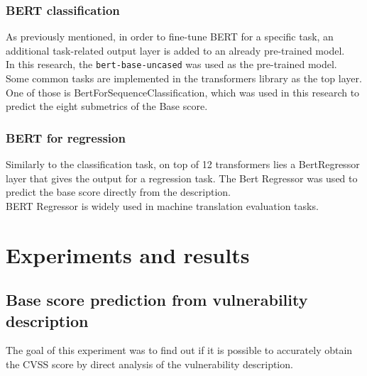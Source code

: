 \documentclass[times, utf8, zavrsni, english]{fer}
\begin{document}
\subsection{BERT classification}
As previously mentioned, in order to fine-tune BERT for a specific task, an additional task-related output layer is added to an already pre-trained model.\\
In this research, the \texttt{bert-base-uncased} was used as the pre-trained model.\\
Some common tasks are implemented in the transformers library as the top layer. One of those is BertForSequenceClassification, which was used in this research to predict the eight submetrics of the Base score. 
\subsection{BERT for regression}
Similarly to the classification task, on top of 12 transformers lies a BertRegressor layer that gives the output for a regression task. The Bert Regressor was used to predict the base score directly from the description.\\
BERT Regressor is widely used in machine translation evaluation tasks. \citep{shimanaka}

\chapter{Experiments and results}
\section{Base score prediction from vulnerability description}
The goal of this experiment was to find out if it is possible to accurately obtain the CVSS score by direct analysis of the vulnerability description.
\end{document}
